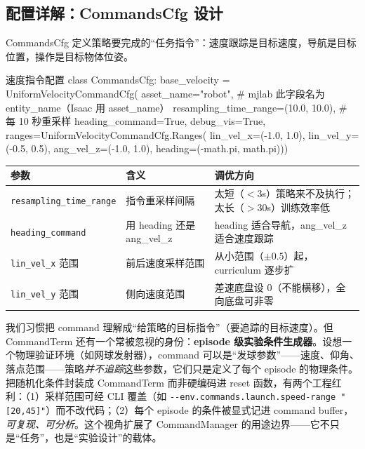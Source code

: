 \subsection{配置详解：CommandsCfg 设计}
\label{sec:rlmc-diy-events-cmd}

CommandsCfg 定义策略要完成的“任务指令”：速度跟踪是目标速度，导航是目标位置，操作是目标物体位姿。

\begin{codebox}[Python]{速度指令配置}
class CommandsCfg:
    base_velocity = UniformVelocityCommandCfg(
        asset_name="robot",                   # mjlab 此字段名为 entity_name（Isaac 用 asset_name）
        resampling_time_range=(10.0, 10.0),   # 每 10 秒重采样
        heading_command=True, debug_vis=True,
        ranges=UniformVelocityCommandCfg.Ranges(
            lin_vel_x=(-1.0, 1.0), lin_vel_y=(-0.5, 0.5),
            ang_vel_z=(-1.0, 1.0), heading=(-math.pi, math.pi)))
\end{codebox}

\begin{center}
\small
\begin{tabular}{@{}lp{4.0cm}p{5.0cm}@{}}
\toprule
参数 & 含义 & 调优方向 \\
\midrule
\verb|resampling_time_range| & 指令重采样间隔 & 太短（$<3$s）策略来不及执行；太长（$>30$s）训练效率低 \\
\verb|heading_command| & 用 heading 还是 ang\_vel\_z & heading 适合导航，ang\_vel\_z 适合速度跟踪 \\
\verb|lin_vel_x| 范围 & 前后速度采样范围 & 从小范围（$\pm 0.5$）起，curriculum 逐步扩 \\
\verb|lin_vel_y| 范围 & 侧向速度范围 & 差速底盘设 0（不能横移），全向底盘可非零 \\
\bottomrule
\end{tabular}
\end{center}

\begin{insight}\label{ins:rlmc-diy-command}
我们习惯把 command 理解成“给策略的目标指令”（要追踪的目标速度）。但 CommandTerm 还有一个常被忽视的身份：\textbf{episode 级实验条件生成器}。设想一个物理验证环境（如网球发射器），command 可以是“发球参数”——速度、仰角、落点范围——策略\emph{并不追踪}这些参数，它们只是定义了每个 episode 的物理条件。把随机化条件封装成 CommandTerm 而非硬编码进 reset 函数，有两个工程红利：（1）采样范围可经 CLI 覆盖（如 \verb|--env.commands.launch.speed-range "[20,45]"|）而不改代码；（2）每个 episode 的条件被显式记进 command buffer，\emph{可复现、可分析}。这个视角扩展了 CommandManager 的用途边界——它不只是“任务”，也是“实验设计”的载体。
\end{insight}

